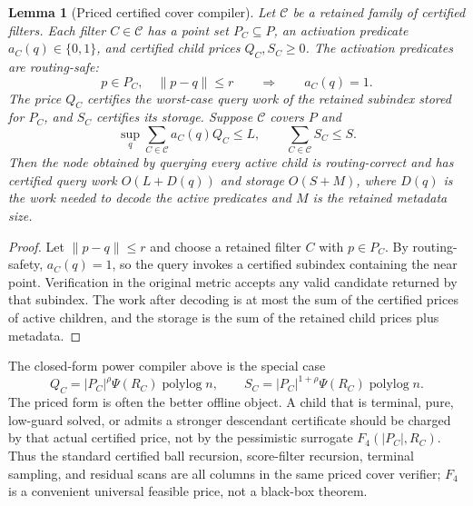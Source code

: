 \documentclass[10pt]{article}
\newtheorem{lemma}[theorem]{Lemma}
\theoremstyle{definition}
\newcommand{\polylog}{\operatorname{polylog}}
\begin{document}
\begin{lemma}[Priced certified cover compiler]
   \label{lem:priced-cover-compiler}
   Let $\mathcal C$ be a retained family of certified filters.  Each filter
   $C\in\mathcal C$ has a point set $P_C\subseteq P$, an activation predicate
   $a_C(q)\in\{0,1\}$, and certified child prices $Q_C,S_C\ge0$.  The
   activation predicates are routing-safe:
   \[
      p\in P_C,\quad \|p-q\|\le r
      \qquad\Longrightarrow\qquad
      a_C(q)=1 .
   \]
   The price $Q_C$ certifies the worst-case query work of the retained
   subindex stored for $P_C$, and $S_C$ certifies its storage.  Suppose
   $\mathcal C$ covers $P$ and
   \[
      \sup_q\sum_{C\in\mathcal C}a_C(q)Q_C\le L,
      \qquad
      \sum_{C\in\mathcal C}S_C\le S .
   \]
   Then the node obtained by querying every active child is routing-correct and
   has certified query work $O(L+D(q))$ and storage $O(S+M)$, where $D(q)$ is
   the work needed to decode the active predicates and $M$ is the retained
   metadata size.
\end{lemma}

\begin{proof}
   Let $\|p-q\|\le r$ and choose a retained filter $C$ with $p\in P_C$.  By
   routing-safety, $a_C(q)=1$, so the query invokes a certified subindex
   containing the near point.  Verification in the original metric accepts any
   valid candidate returned by that subindex.  The work after decoding is at
   most the sum of the certified prices of active children, and the storage is
   the sum of the retained child prices plus metadata.
\end{proof}

The closed-form power compiler above is the special case
\[
   Q_C=|P_C|^\rho\Psi(R_C)\polylog n,
   \qquad
   S_C=|P_C|^{1+\rho}\Psi(R_C)\polylog n .
\]
The priced form is often the better offline object.  A child that is terminal,
pure, low-guard solved, or admits a stronger descendant certificate should be
charged by that actual certified price, not by the pessimistic surrogate
$F_4(|P_C|,R_C)$.  Thus the standard certified ball recursion, score-filter
recursion, terminal sampling, and residual scans are all columns in the same
priced cover verifier; $F_4$ is a convenient universal feasible price, not a
black-box theorem.
\end{document}
